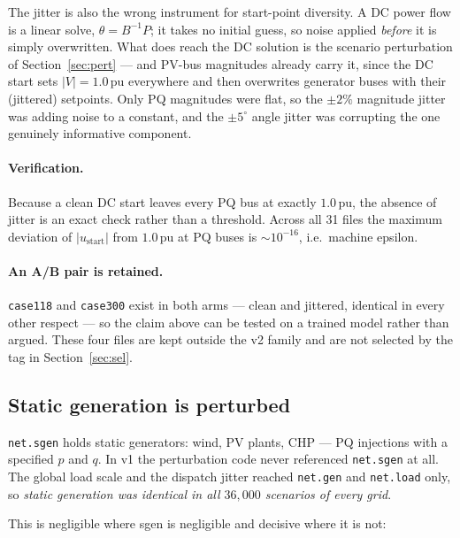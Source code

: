 \documentclass{article}
\newcommand{\pu}{\,\text{pu}}
\begin{document}
\noindent
The jitter is also the wrong instrument for start-point diversity.  A DC power
flow is a linear solve, $\theta = B^{-1}P$; it takes no initial guess, so noise
applied \emph{before} it is simply overwritten.  What does reach the DC
solution is the scenario perturbation of Section~\ref{sec:pert} --- and PV-bus
magnitudes already carry it, since the DC start sets $|V| = 1.0\pu$ everywhere
and then overwrites generator buses with their (jittered) setpoints.  Only PQ
magnitudes were flat, so the $\pm2\%$ magnitude jitter was adding noise to a
constant, and the $\pm5^\circ$ angle jitter was corrupting the one genuinely
informative component.

\paragraph{Verification.}
Because a clean DC start leaves every PQ bus at exactly $1.0\pu$, the absence of
jitter is an exact check rather than a threshold.  Across all 31 files the
maximum deviation of $|u_{\text{start}}|$ from $1.0\pu$ at PQ buses is
$\sim\!10^{-16}$, i.e.\ machine epsilon.

\paragraph{An A/B pair is retained.}
\texttt{case118} and \texttt{case300} exist in both arms --- clean and jittered,
identical in every other respect --- so the claim above can be tested on a
trained model rather than argued.  These four files are kept outside the v2
family and are not selected by the tag in Section~\ref{sec:sel}.


\subsection{Static generation is perturbed}
\label{sec:sgen}

\texttt{net.sgen} holds static generators: wind, PV plants, CHP --- PQ
injections with a specified $p$ and $q$.  In v1 the perturbation code never
referenced \texttt{net.sgen} at all.  The global load scale and the dispatch
jitter reached \texttt{net.gen} and \texttt{net.load} only, so \emph{static
generation was identical in all $36{,}000$ scenarios of every grid}.

This is negligible where sgen is negligible and decisive where it is not:
\end{document}
